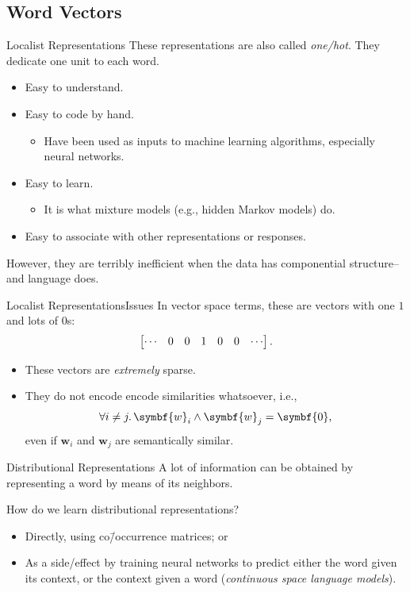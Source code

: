\documentclass[usepdftitle=false]{beamer}
\theoremstyle{definition}
\renewcommand*{\vec}{\symbf}%
\begin{document}
\subsection{Word Vectors}

\begin{frame}{Localist Representations}
  These representations are also called \emph{one\-/hot}.  They
  dedicate one unit to each word.
  \begin{itemize}
  \item Easy to understand.
  \item Easy to code by hand.
    \begin{itemize}
    \item Have been used as inputs to machine learning algorithms, especially
      neural networks.
    \end{itemize}
  \item Easy to learn.
    \begin{itemize}
    \item It is what mixture models (e.g., hidden Markov models) do.
    \end{itemize}
  \item Easy to associate with other representations or responses.
  \end{itemize}
  \alert{However}, they are terribly inefficient when the data has
  componential structure\--- and language does.
\end{frame}

\begin{frame}{Localist Representations}{Issues}
  In vector space terms, these are vectors with one \(1\) and lots of
  \(0\)s:
  \[
    \begin{bmatrix}
      \cdots & 0 & 0 & 1 & 0 & 0 & \cdots
    \end{bmatrix}\text.
  \]
  \begin{itemize}
  \item These vectors are \emph{extremely} sparse.
  \item They do not encode encode similarities whatsoever, i.e.,
    \[
      \forall i \ne j\ldotp \vec{w}_i \wedge \vec{w}_j = \vec{0}\text,
    \]
    even if \(\vec{w}_i\) and \(\vec{w}_j\) are semantically similar.
  \end{itemize}
\end{frame}

\begin{frame}{Distributional Representations}
  A lot of information can be obtained by representing a word by means
  of its neighbors.
  \begin{displayquote}[J.~R.~Firth]
  \end{displayquote}
  How do we learn distributional representations?
  \begin{itemize}
  \item Directly, using co\=/occurrence matrices; or
  \item As a side\-/effect by training neural networks to predict
    either the word given its context, or the context given a word
    (\emph{continuous space language models}).
  \end{itemize}
\end{frame}
\end{document}

